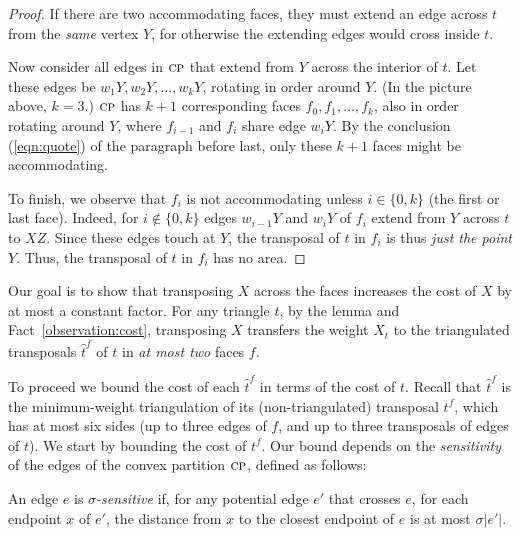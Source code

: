 \documentclass[final]{siamltex}
\newcommand{\transposal}[2]{{#1}^{#2}}
\newcommand{\triangulated}[2]{{\widehat{#1}}^{#2}}
\newcommand{\edge}{e}
\newcommand{\face}{f}
\newcommand{\tri}{t}  \newcommand{\vertex}{v}
\newcommand{\fracTriang}{X}
\newcommand{\sensitivity}{\sigma}
\begin{document}
\begin{proof}
If there are two accommodating faces, they must extend an edge across $\tri$ 
from the {\em same} vertex $Y$, for otherwise the extending edges would cross inside $\tri$.

Now consider all edges in $\text{\sc cp}$ that extend from $Y$ across the interior of $\tri$.
Let these edges be $w_1 Y, w_2 Y, \ldots, w_k Y$, rotating in order around $Y$.
(In the picture above, $k=3$.)
$\text{\sc cp}$ has $k+1$ corresponding faces $\face_0, \face_1, \ldots, \face_k$, 
also in order rotating around $Y$,
where $\face_{i-1}$ and $\face_i$ share edge $w_i Y$.
By the conclusion (\ref{eqn:quote}) of the paragraph before last,
only these $k+1$ faces might be accommodating.

 To finish, we observe that $\face_i$ is not accommodating
unless $i\in\{0,k\}$ (the first or last face).
Indeed, for $i\not\in\{0,k\}$ edges $w_{i-1} Y$ and $w_i Y$ of $\face_i$ 
extend from $Y$ across $\tri$ to $X Z$.
Since these edges touch at $Y$,
the transposal of $\tri$ in $\face_i$ is thus {\em just the point $Y$}.
Thus, the transposal of $\tri$ in $\face_i$ has no area.
\end{proof}

Our goal is to show that transposing $\fracTriang$ across the faces
increases the cost of $\fracTriang$ by at most a constant factor.
For any triangle $\tri$, 
by the lemma and Fact~\ref{observation:cost}, 
transposing $\fracTriang$
transfers the weight $\fracTriang_\tri$ 
to the triangulated transposals $\triangulated{\tri}{\face}$ of $\tri$
in {\em at most two} faces $\face$.

To proceed we bound the cost of each
$\triangulated{\tri}{\face}$ in terms of the cost of $\tri$.
Recall that $\triangulated{\tri}{\face}$ is the minimum-weight triangulation of
its (non-triangulated) transposal $\transposal{\tri}{\face}$,
which has at most six sides (up to three edges of $\face$,
and up to three transposals of edges of $\tri$).
We start by bounding the cost of $\transposal{\tri}{\face}$.
Our bound depends on the {\em sensitivity} of the edges of the convex partition $\text{\sc cp}$,
defined as follows:

\begin{definition}[sensitivity]\label{def:sensitivity}
An edge $\edge$ is {\em $\sensitivity$-sensitive} if, 
  for any potential edge $\edge'$ that crosses $\edge$,
  for each endpoint $x$ of $\edge'$,
  the distance from $x$ to the closest endpoint of $\edge$
  is at most $\sensitivity|\edge'|$.
\end{definition}
\end{document}
